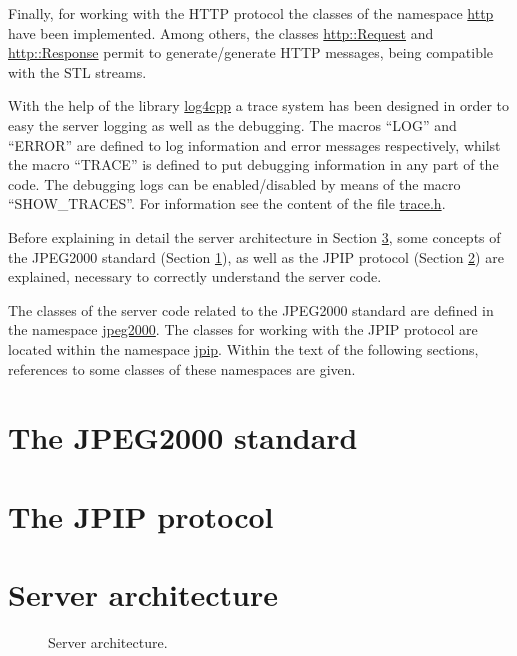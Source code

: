 Finally, for working with the HTTP protocol the classes of the namespace
\hyperlink{namespacehttp}{http} have been implemented. Among others, the
classes \hyperlink{classhttp_1_1Request}{http::Request} and 
\hyperlink{classhttp_1_1Response}{http::Response} permit to generate/generate
HTTP messages, being compatible with the STL streams.

With the help of the library \href{http://log4cpp.sourceforge.net/}{log4cpp}
a trace system has been designed in order to easy the server logging as well
as the debugging. The macros ``LOG'' and ``ERROR'' are defined to log
information and error messages respectively, whilst the macro ``TRACE'' is
defined to put debugging information in any part of the code. The debugging
logs can be enabled/disabled by means of the macro ``SHOW\_TRACES''. For
information see the content of the file \hyperlink{trace_8h}{trace.h}.

Before explaining in detail the server architecture in Section \ref{sec:architecture},
some concepts of the JPEG2000 standard (Section \ref{sec:jpeg2000}), as well as
the JPIP protocol (Section \ref{sec:jpip}) are explained, necessary to
correctly understand the server code.

The classes of the server code related to the JPEG2000 standard are defined in
the namespace \hyperlink{namespacejpeg2000}{jpeg2000}. The classes for working
with the JPIP protocol are located within the namespace \hyperlink{namespacejpip}
{jpip}. Within the text of the following sections, references to some classes
of these namespaces are given.

\section{The JPEG2000 standard}
\label{sec:jpeg2000}


\section{The JPIP protocol}
\label{sec:jpip}


\newpage

\section{Server architecture}
\label{sec:architecture}

\begin{figure}[!b]
\centering
\resizebox{0.8\textwidth}{!}{

}
\caption{Server architecture.}
\label{fig:server}
\end{figure}

